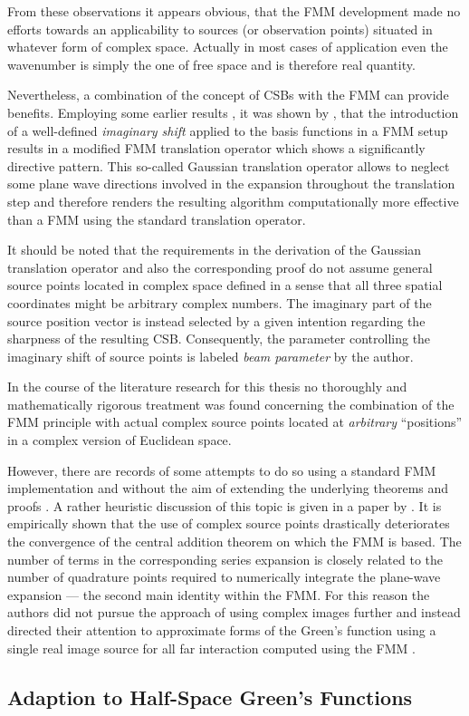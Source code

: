 From these observations it appears obvious, that the \ac{FMM} development
made no efforts towards an applicability to sources (or observation points)
situated in whatever form of complex space.
Actually in most cases of application even the wavenumber is simply the one of
free space and is therefore real quantity.

Nevertheless, a combination of the concept of \acp{CSB} with the \ac{FMM} can
provide benefits.
Employing some earlier results \cite{Hansen2009}, it was shown by
\textcite{Hansen2013}, that the introduction of a well-defined
\emph{imaginary shift} applied to the basis functions in a \ac{FMM} setup
results in a modified \ac{FMM} translation operator which shows a significantly
directive pattern.
This so-called Gaussian translation operator allows to neglect some plane wave
directions involved in the expansion throughout the translation step
and therefore renders the resulting algorithm computationally more effective
than a \ac{FMM} using the standard translation operator.

It should be noted that the requirements in the derivation of the Gaussian
translation operator and also the corresponding proof 
\cite[Appendix]{Hansen2013} do not assume general source points located in
complex space defined in a sense that all three spatial coordinates might
be arbitrary complex numbers.
The imaginary part of the source position vector is instead selected by a given
intention regarding the sharpness of the resulting \ac{CSB}.
Consequently, the parameter controlling the imaginary shift of source points
is labeled \emph{beam parameter} by the author.


In the course of the literature research for this thesis no thoroughly and 
mathematically rigorous treatment was found concerning the combination
of the \ac{FMM} principle with actual complex source points located at
\emph{arbitrary} \enquote{positions} in a complex version of Euclidean space.

However, there are records of some attempts to do so using a standard \ac{FMM}
implementation and without the aim of extending the underlying theorems and
proofs \cite{Rokhlin1993}.
A rather heuristic discussion of this topic is given in a paper by
\textcite{Geng2001}.
It is empirically shown that the use of complex source points drastically
deteriorates the convergence of the central addition theorem on which the
\ac{FMM} is based.
The number of terms in the corresponding series expansion is closely
related to the number of quadrature points required to numerically integrate
the plane-wave expansion --- the second main identity within the
\ac{FMM}.
For this reason the authors did not pursue the approach of using complex images
further and instead directed their attention to approximate forms of the
Green's function using a single real image source for all far interaction
computed using the \ac{FMM} \cite{Geng1999, Geng2000}.

\subsection{Adaption to Half-Space Green's Functions}

\cite{Geng2000}
\cite{Liu2002}
\cite{Eibert2018}
\cite{Eibert2018a}
\cite{Eibert2019}
\cite[Chapter~8.13.2]{parini2020}

